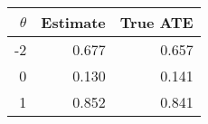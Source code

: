 
\begin{tabular}{rrr}
\toprule
$\theta$ & Estimate & True ATE\\
\midrule
-2 & 0.677 & 0.657\\
0 & 0.130 & 0.141\\
1 & 0.852 & 0.841\\
\bottomrule
\end{tabular}
